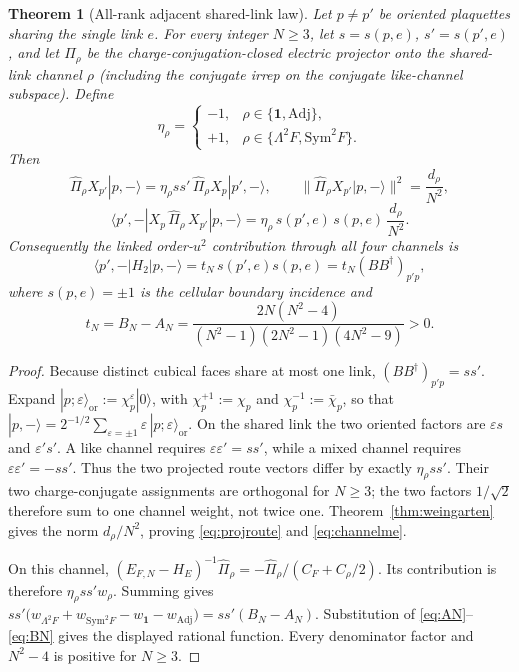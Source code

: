 \documentclass[11pt]{article}
\theoremstyle{plain}
\newtheorem{theorem}{Theorem}
\theoremstyle{definition}
\theoremstyle{remark}
\newcommand{\chk}[1]{}
\newcommand{\CF}{C_F}
\newcommand{\dg}{^{\dagger}}
\begin{document}
\begin{theorem}[All-rank adjacent shared-link law]\label{thm:allrank}
Let $p\ne p'$ be oriented plaquettes sharing the single link $e$. For every
integer $N\ge3$, let $s=s(p,e)$, $s'=s(p',e)$, and let $\hat\Pi_\rho$ be the
charge-conjugation-closed electric projector onto the shared-link channel
$\rho$ (including the conjugate irrep on the conjugate like-channel
subspace). Define
\[
  \eta_\rho=
  \begin{cases}
    -1,&\rho\in\{\mathbf1,\mathrm{Adj}\},\\
    +1,&\rho\in\{\Lambda^2F,\mathrm{Sym}^2F\}.
  \end{cases}
\]
Then
\begin{equation}\label{eq:projroute}
  \hat\Pi_\rho X_{p'}|p,-\rangle=\eta_\rho ss'\,\hat\Pi_\rho X_p|p',-\rangle,
  \qquad
  \bigl\|\hat\Pi_\rho X_{p'}|p,-\rangle\bigr\|^2=\frac{d_\rho}{N^2},
\end{equation}
\begin{equation}\label{eq:channelme}
  \langle p',-|X_p\,\hat\Pi_\rho\,X_{p'}|p,-\rangle
  =\eta_\rho\,s(p',e)\,s(p,e)\,\frac{d_\rho}{N^2}.
\end{equation}
Consequently the linked order-$u^2$ contribution through all four channels is
\[
  \langle p',-|H_2|p,-\rangle
  =t_N\,s(p',e)s(p,e)
  =t_N(BB\dg)_{p'p},
\]
where $s(p,e)=\pm1$ is the cellular boundary incidence and
\[
  t_N=B_N-A_N=\frac{2N(N^2-4)}{(N^2-1)(2N^2-1)(4N^2-9)}>0 .
\]
\end{theorem}

\begin{proof}
Because distinct cubical faces share at most one link,
$(BB\dg)_{p'p}=ss'$. Expand
$|p;\varepsilon\rangle_{\mathrm{or}}:=\chi^\varepsilon_p|0\rangle$, with
$\chi^{+1}_p:=\chi_p$ and $\chi^{-1}_p:=\bar\chi_p$, so that
$|p,-\rangle=2^{-1/2}\sum_{\varepsilon=\pm1}\varepsilon\,
|p;\varepsilon\rangle_{\mathrm{or}}$.
On the shared link the two oriented factors are $\varepsilon s$ and
$\varepsilon's'$. A like channel requires $\varepsilon\varepsilon'=ss'$, while
a mixed channel requires $\varepsilon\varepsilon'=-ss'$. Thus the two
projected route vectors differ by exactly $\eta_\rho ss'$. Their two
charge-conjugate assignments are orthogonal for $N\ge3$; the two factors
$1/\sqrt2$ therefore sum to one channel weight, not twice one.
Theorem~\ref{thm:weingarten} gives the norm $d_\rho/N^2$, proving
\eqref{eq:projroute} and \eqref{eq:channelme}.

On this channel,
$(E_{F,N}-H_E)^{-1}\hat\Pi_\rho=-\hat\Pi_\rho/(\CF+C_\rho/2)$. Its
contribution is therefore $\eta_\rho ss'w_\rho$. Summing gives
$ss'\bigl(w_{\Lambda^2F}+w_{\mathrm{Sym}^2F}-w_{\mathbf1}-w_{\mathrm{Adj}}\bigr)
 =ss'(B_N-A_N)$. Substitution of \eqref{eq:AN}--\eqref{eq:BN} gives the
displayed rational function. Every denominator factor and $N^2-4$ is positive
for $N\ge3$.
\end{proof}
\chk{t\_N = B\_N - A\_N}\chk{t\_N > 0 for N >= 3}
\end{document}
